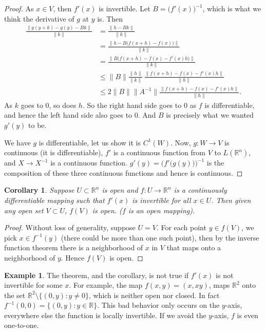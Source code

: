 \documentclass[12pt]{book}
\newcommand{\snorm}[1]{\lVert {#1} \rVert}
\newcommand{\R}{{\mathbb{R}}}
\theoremstyle{plain}
\newtheorem{cor}[thm]{Corollary}
\theoremstyle{remark}
\theoremstyle{definition}
\theoremstyle{exercise}
\theoremstyle{example}
\newtheorem{example}[thm]{Example}
\begin{document}
\begin{proof}
As $x \in V$, then $f'(x)$ is invertible.
Let $B = \bigl(f'(x)\bigr)^{-1}$, which is what we think the derivative of
$g$ at $y$ is.  Then
\begin{equation*}
\begin{split}
\frac{\snorm{g(y+k)-g(y)-Bk}}{\snorm{k}}
& =
\frac{\snorm{h-Bk}}{\snorm{k}}
\\
& =
\frac{\snorm{h-B\bigl(f(x+h)-f(x)\bigr)}}{\snorm{k}}
\\
& =
\frac{\snorm{B\bigl(f(x+h)-f(x)-f'(x)h\bigr)}}{\snorm{k}}
\\
& \leq
\snorm{B}
\frac{\snorm{h}}{\snorm{k}}\,
\frac{\snorm{f(x+h)-f(x)-f'(x)h}}{\snorm{h}}
\\
& \leq
2\snorm{B}\snorm{A^{-1}}
\frac{\snorm{f(x+h)-f(x)-f'(x)h}}{\snorm{h}} .
\end{split}
\end{equation*}
As $k$ goes to 0, so does $h$.  So the right hand side goes to 0 as $f$ is
differentiable, and hence
the left hand side also goes to 0.  And
$B$ is precisely what we wanted $g'(y)$ to be.

We have $g$ is differentiable, let us show it is $C^1(W)$.
Now, $g \colon W \to V$ is continuous (it is differentiable),
$f'$ is a continuous function from $V$
to $L(\R^n)$, and $X \to X^{-1}$ is a continuous function.  
$g'(y) = {\bigl( f'\bigl(g(y)\bigr)\bigr)}^{-1}$ is the composition
of these three
continuous functions and hence is continuous.
\end{proof}

\begin{cor}
Suppose $U \subset \R^n$ is open and $f \colon U \to \R^n$ is a continuously
differentiable mapping such that $f'(x)$ is invertible for all $x \in U$.  Then
given any open set $V \subset U$, $f(V)$ is open.  ($f$ is an open mapping).
\end{cor}

\begin{proof}
Without loss of generality, suppose $U=V$.
For each point $y \in f(V)$, we pick $x \in f^{-1}(y)$ (there could be more
than one such point), then by the inverse function theorem there is a
neighborhood of $x$ in $V$ that maps onto a neighborhood of $y$.  Hence
$f(V)$ is open.
\end{proof}

\begin{example}
The theorem, and the corollary, is not true if $f'(x)$ is not invertible for
some $x$.  For example,
the map $f(x,y) = (x,xy)$, maps $\R^2$ onto the set
$\R^2 \setminus \{ (0,y) : y \neq 0 \}$, which is neither open nor closed.
In fact $f^{-1}(0,0) = \{ (0,y) : y \in \R \}$.  This bad behavior
only occurs on the $y$-axis, everywhere else the function is locally
invertible.  If we avoid the $y$-axis, $f$ is even one-to-one.
\end{example}
\end{document}
